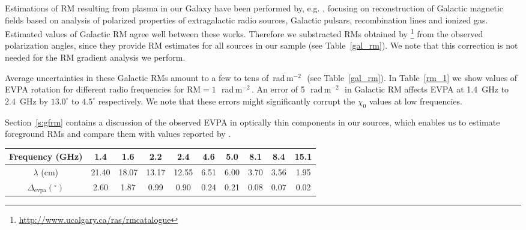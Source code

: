 \documentclass[a4paper,fleqn,usenatbib,useAMS]{mnras}
\newcommand{\rmu}{\,rad\,m$^{-2}$\,} %
\begin{document}
Estimations of RM resulting from plasma in our Galaxy have been performed by, e.g.
\citet{taylor_etal09,mao_etal10,vaneck_etal11,jansson_farrar_12,opperman_etal12,han13}, focusing on reconstruction of Galactic magnetic fields based on analysis of polarized properties of extragalactic radio sources, Galactic pulsars, recombination lines and ionized gas. 
Estimated values of Galactic RM agree well between these works.
Therefore we substracted RMs obtained by \citet{taylor_etal09}\footnote{\url{http://www.ucalgary.ca/ras/rmcatalogue}}  from the observed polarization angles, since they provide RM estimates for all sources in our sample (see Table~\ref{gal_rm}).
We note that this correction is not needed for the RM gradient analysis we perform.


Average uncertainties in these Galactic RMs amount to a few to tens of \rmu\ (see Table~\ref{gal_rm}).
In Table~\ref{rm_1} we show values of EVPA rotation for different radio frequencies for ${\mathrm{RM}}=1$~\rmu. 
An error of 5~\rmu\ in Galactic RM affects EVPA at 1.4~GHz to 2.4~GHz by $13.0^\circ$ to $4.5^\circ$ respectively.
We note that these errors might significantly corrupt the $\chi_0$ values at low frequencies.

Section~\ref{s:gfrm} contains a discussion of the observed EVPA in optically thin components in our sources, which enables us to estimate foreground RMs and compare them with values reported by \citet{taylor_etal09}.



\begin{table*}
 \centering
 \begin{minipage}{120mm}
  \caption{EVPA rotation, $\Delta_{evpa}$, due to rotation measure of 1~\rmu.}
  \begin{tabular}{@{}cccccccccc@{}}
  \hline
   Frequency (GHz) & 1.4 & 1.6 & 2.2 & 2.4 & 4.6 & 5.0 & 8.1 & 8.4 & 15.1 \\
 \hline
 $\lambda$ (cm) & 21.40 & 18.07 & 13.17 & 12.55 & 6.51 & 6.00 & 3.70 & 3.56 & 1.95 \\
 $\Delta_\mathrm{evpa}(^\circ)$ & 2.60 & 1.87 & 0.99 & 0.90 & 0.24 & 0.21 & 0.08 & 0.07 & 0.02 \\
\hline
\end{tabular}
\label{rm_1}
\end{minipage}
\end{table*}
\end{document}
